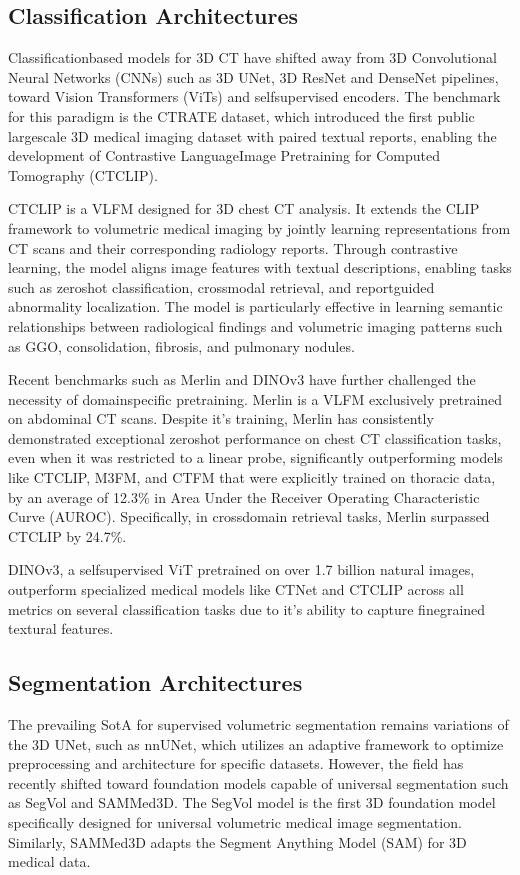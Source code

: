 \subsection{Classification Architectures}
Classificationbased models for 3D CT have shifted away from 3D Convolutional Neural Networks (CNNs) such as 3D UNet,
3D ResNet and DenseNet pipelines, toward Vision Transformers (ViTs) and selfsupervised encoders. The benchmark for this paradigm is
the CTRATE dataset, which introduced the first public largescale 3D medical imaging dataset with paired textual reports, enabling
the development of Contrastive LanguageImage Pretraining for Computed Tomography (CTCLIP).

CTCLIP is a VLFM designed for 3D chest CT analysis. It extends the CLIP framework to volumetric medical
imaging by jointly learning representations from CT scans and their corresponding radiology reports. \cite{hamamci2024ctclip,radford2021clip}
Through contrastive learning, the model aligns image features with textual descriptions, enabling tasks such as zeroshot classification,
crossmodal retrieval, and reportguided abnormality localization. \cite{hamamci2024ctclip}
The model is particularly effective in learning semantic relationships between radiological findings and volumetric imaging
patterns such as GGO, consolidation, fibrosis, and pulmonary nodules. \cite{hamamci2024ctclip,rexgroundingct}

Recent benchmarks such as Merlin and DINOv3 have further challenged the necessity of domainspecific pretraining.
Merlin is a VLFM exclusively pretrained on abdominal CT scans. Despite it's training, Merlin
has consistently demonstrated exceptional zeroshot performance on chest CT classification tasks, even when it was
restricted to a linear probe, significantly outperforming models like CTCLIP, M3FM, and CTFM that were explicitly
trained on thoracic data, by an average of 12.3\% in Area Under the Receiver Operating Characteristic Curve (AUROC).
Specifically, in crossdomain retrieval tasks, Merlin surpassed CTCLIP by 24.7\%.

DINOv3, a selfsupervised ViT pretrained on over 1.7 billion natural images, outperform specialized medical models like
CTNet and CTCLIP across all metrics on several classification tasks due to it's ability to capture finegrained textural features.

\subsection{Segmentation Architectures}
The prevailing SotA for supervised volumetric segmentation remains variations of the 3D UNet, such as nnUNet, which
utilizes an adaptive framework to optimize preprocessing and architecture for specific datasets. However, the field has
recently shifted toward foundation models capable of universal segmentation such as SegVol and SAMMed3D.
The SegVol model is the first 3D foundation model specifically designed for universal volumetric medical image segmentation.
Similarly, SAMMed3D adapts the Segment Anything Model (SAM) for 3D medical data.


